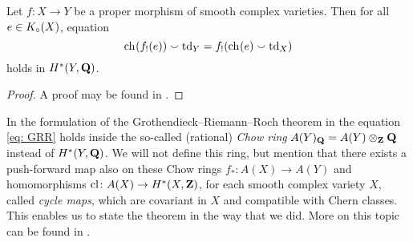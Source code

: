 
\begin{theorem}
    \label{Grothendieck-Riemann-Roch}
    Let $f \colon X \to Y$ be a proper morphism of smooth complex varieties. Then for all $e \in K_{\circ}(X)$, equation 
    \begin{equation}
        \label{eq: GRR}
        \ch[]{f_!(e)} \smallsmile \tdclass{Y} = f_!(\ch[]{e} \smallsmile \tdclass{X})
    \end{equation}
    holds in $H^{*}(Y, \mathbf Q)$.
\end{theorem}

\begin{proof}
    A proof may be found in \cite[\S 15]{Fulton1998}.
\end{proof}

\begin{remark}
    In the formulation of the Grothendieck--Riemann--Roch theorem in \cite[\S 15, Theorem 15.2]{Fulton1998} the equation \eqref{eq: GRR} holds inside the so-called (rational) \emph{Chow ring} $A(Y)_\mathbf Q = A(Y) \otimes_{\mathbf Z} \mathbf Q$ instead of $H^{*}(Y, \mathbf Q)$. We will not define this ring, but mention that there exists a push-forward map also on these Chow rings $f_* \colon A(X) \to A(Y)$ and homomorphisms $\operatorname{cl} \colon A(X) \to H^{*}(X, \mathbf Z)$, for each smooth complex variety $X$, called \emph{cycle maps}, which are covariant in $X$ and compatible with Chern classes. This enables us to state the theorem in the way that we did. More on this topic can be found in \cite[\S 19]{Fulton1998}.
\end{remark}

